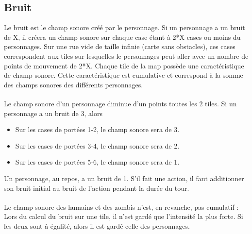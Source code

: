 \subsection{Bruit}
Le bruit est le champ sonore créé par le personnage. Si un personnage a un bruit de X, il créera un champ sonore sur chaque case étant à 2*X cases ou moins du personnages. Sur une rue vide de taille infinie (carte sans obstacles), ces cases correspondent aux tiles sur lesquelles le personnages peut aller avec un nombre de points de mouvement de 2*X. Chaque tile de la map possède une caractéristique de champ sonore. Cette caractéristique est cumulative et correspond à la somme des champs sonores des différents personnages. 
\\\\
Le champ sonore d'un personnage diminue d'un points toutes les 2 tiles. Si un personnage a un bruit de 3, alors
\begin{itemize}
   \item Sur les cases de portées 1-2, le champ sonore sera de 3.
   \item Sur les cases de portées 3-4, le champ sonore sera de 2.
   \item Sur les cases de portées 5-6, le champ sonore sera de 1.
\end{itemize} 
Un personnage, au repos, a un bruit de 1. S'il fait une action, il faut additionner son bruit initial au bruit de l'action pendant la durée du tour.
\\\\
Le champ sonore des humains et des zombis n'est, en revanche, pas cumulatif : Lors du calcul du bruit sur une tile, il n'est gardé que l'intensité la plus forte. Si les deux sont à égalité, alors il est gardé celle des personnages.
